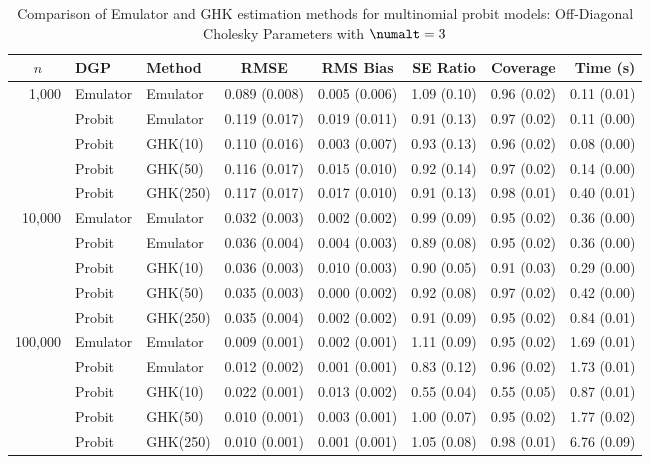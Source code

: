 \begin{table}[htbp]
\centering
\footnotesize
\begin{tabular}{@{}rllrrrrr@{}}
\toprule
\multicolumn{1}{c}{$n$} & \multicolumn{1}{l}{DGP} & \multicolumn{1}{l}{Method} & \multicolumn{1}{c}{RMSE} & \multicolumn{1}{c}{RMS Bias} & \multicolumn{1}{c}{SE Ratio} & \multicolumn{1}{c}{Coverage} & \multicolumn{1}{r}{Time (s)} \\
\midrule
\multirow{5}{*}{1,000} & Emulator & Emulator & 0.089 (0.008) & 0.005 (0.006) & 1.09 (0.10) & 0.96 (0.02) & 0.11 (0.01) \\
 & Probit & Emulator & 0.119 (0.017) & 0.019 (0.011) & 0.91 (0.13) & 0.97 (0.02) & 0.11 (0.00) \\
 & Probit & GHK(10) & 0.110 (0.016) & 0.003 (0.007) & 0.93 (0.13) & 0.96 (0.02) & 0.08 (0.00) \\
 & Probit & GHK(50) & 0.116 (0.017) & 0.015 (0.010) & 0.92 (0.14) & 0.97 (0.02) & 0.14 (0.00) \\
 & Probit & GHK(250) & 0.117 (0.017) & 0.017 (0.010) & 0.91 (0.13) & 0.98 (0.01) & 0.40 (0.01) \\
\midrule
\multirow{5}{*}{10,000} & Emulator & Emulator & 0.032 (0.003) & 0.002 (0.002) & 0.99 (0.09) & 0.95 (0.02) & 0.36 (0.00) \\
 & Probit & Emulator & 0.036 (0.004) & 0.004 (0.003) & 0.89 (0.08) & 0.95 (0.02) & 0.36 (0.00) \\
 & Probit & GHK(10) & 0.036 (0.003) & 0.010 (0.003) & 0.90 (0.05) & 0.91 (0.03) & 0.29 (0.00) \\
 & Probit & GHK(50) & 0.035 (0.003) & 0.000 (0.002) & 0.92 (0.08) & 0.97 (0.02) & 0.42 (0.00) \\
 & Probit & GHK(250) & 0.035 (0.004) & 0.002 (0.002) & 0.91 (0.09) & 0.95 (0.02) & 0.84 (0.01) \\
\midrule
\multirow{5}{*}{100,000} & Emulator & Emulator & 0.009 (0.001) & 0.002 (0.001) & 1.11 (0.09) & 0.95 (0.02) & 1.69 (0.01) \\
 & Probit & Emulator & 0.012 (0.002) & 0.001 (0.001) & 0.83 (0.12) & 0.96 (0.02) & 1.73 (0.01) \\
 & Probit & GHK(10) & 0.022 (0.001) & 0.013 (0.002) & 0.55 (0.04) & 0.55 (0.05) & 0.87 (0.01) \\
 & Probit & GHK(50) & 0.010 (0.001) & 0.003 (0.001) & 1.00 (0.07) & 0.95 (0.02) & 1.77 (0.02) \\
 & Probit & GHK(250) & 0.010 (0.001) & 0.001 (0.001) & 1.05 (0.08) & 0.98 (0.01) & 6.76 (0.09) \\
\bottomrule
\end{tabular}
\caption{Comparison of Emulator and GHK estimation methods for multinomial probit models: Off-Diagonal Cholesky Parameters with $\numalt=3$}
\label{tab:emulator_vs_ghk:3:llower}
\end{table}